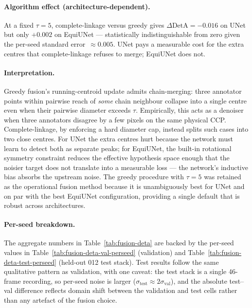 \paragraph{Algorithm effect (architecture-dependent).}
At a fixed $\tau = 5$, complete-linkage versus greedy gives
$\Delta \mathrm{DetA} = -0.016$ on UNet but only $+0.002$ on EquiUNet
--- statistically indistinguishable from zero given the per-seed standard
error~$\approx 0.005$. UNet pays a measurable cost for the extra centres
that complete-linkage refuses to merge; EquiUNet does not.

\paragraph{Interpretation.}
Greedy fusion's running-centroid update admits chain-merging: three
annotator points within pairwise reach of \emph{some} chain neighbour
collapse into a single centre even when their pairwise diameter exceeds
$\tau$. Empirically, this acts as a denoiser when three annotators disagree
by a few pixels on the same physical CCP. Complete-linkage, by enforcing a
hard diameter cap, instead splits such cases into two close centres.
For UNet the extra centres hurt because the network must learn to detect
both as separate peaks; for EquiUNet, the built-in rotational symmetry
constraint reduces the effective hypothesis space enough that the noisier
target does not translate into a measurable loss --- the network's
inductive bias absorbs the upstream noise. The greedy procedure with
$\tau = 5$ was retained as the operational fusion method because it is
unambiguously best for UNet and on par with the best EquiUNet
configuration, providing a single default that is robust across
architectures.

\paragraph{Per-seed breakdown.}
The aggregate numbers in Table~\ref{tab:fusion-deta} are backed by the
per-seed values in Table~\ref{tab:fusion-deta-val-perseed} (validation) and
Table~\ref{tab:fusion-deta-test-perseed} (held-out 012 test stack). Test
results follow the same qualitative pattern as validation, with one
caveat: the test stack is a single 46-frame recording, so per-seed noise
is larger ($\sigma_\text{test} \approx 2 \sigma_\text{val}$), and the
absolute test--val difference reflects domain shift between the validation
and test cells rather than any artefact of the fusion choice.

